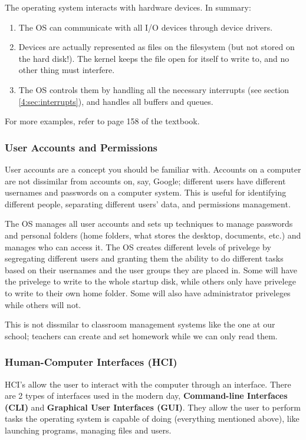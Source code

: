 \documentclass[../main.tex]{subfiles}
\begin{document}
The operating system interacts with hardware devices. In summary:

\begin{enumerate}
    \item The OS can communicate with all I/O devices through device drivers.
    \item Devices are actually represented as files on the filesystem (but not stored on the hard disk!). The kernel keeps the file open for itself to write to, and no other thing must interfere.
    \item The OS controls them by handling all the necessary interrupts (see section \ref{4:sec:interrupts}), and handles all buffers and queues.
\end{enumerate}

For more examples, refer to page 158 of the textbook.

\subsubsection{User Accounts and Permissions}

User accounts are a concept you should be familiar with. Accounts on a computer are not dissimilar from accounts on, say, Google; different users have different usernames and passwords on a computer system. This is useful for identifying different people, separating different users' data, and permissions management.

The OS manages all user accounts and sets up techniques to manage passwords and personal folders (home folders, what stores the desktop, documents, etc.) and manages who can access it. The OS creates different levels of privelege by segregating different users and granting them the ability to do different tasks based on their usernames and the user groups they are placed in. Some will have the privelege to write to the whole startup disk, while others only have privelege to write to their own home folder. Some will also have administrator priveleges while others will not.

This is not dissmilar to classroom management systems like the one at our school; teachers can create and set homework while we can only read them.

\subsubsection{Human-Computer Interfaces (HCI)}

HCI's allow the user to interact with the computer through an interface. There are 2 types of interfaces used in the modern day, \textbf{Command-line Interfaces (CLI)} and \textbf{Graphical User Interfaces (GUI)}. They allow the user to perform tasks the operating system is capable of doing (everything mentioned above), like launching programs, managing files and users. 
\end{document}
